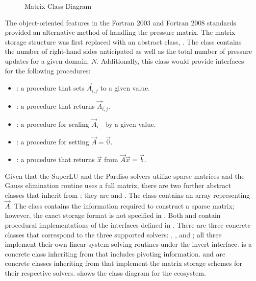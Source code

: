 \begin{figure}[ht!]
\singlespace\centering

\caption{Matrix Class Diagram}
\label{fig:matrixClassDiagram}
\end{figure}

The object-oriented features in the Fortran 2003 and Fortran 2008 standards provided an alternative method of handling the pressure matrix.
The matrix storage structure was first replaced with an abstract class, .
The  class contains the number of right-hand sides anticipated as well as the total number of pressure updates for a given domain, $N$.
Additionally, this class would provide interfaces for the following procedures:

\begin{itemize}
\item{ : a procedure that sets $\vec{A}_{i,j}$ to a given value.}
\item{ : a procedure that returns $\vec{A}_{i,j}$.}
\item{ : a procedure for scaling $\vec{A}_{i, :}$ by a given value.}
\item{ : a procedure for setting $\vec{A} = \vec{0}$.}
\item{ : a procedure that returns $\vec{x}$ from $\vec{A}\vec{x} = \vec{b}$.}
\end{itemize}

Given that the SuperLU and the Pardiso solvers utilize sparse matrices and the Gauss elimination routine uses a full matrix, there are two further abstract classes that inherit from ; they are  and .
The  class contains an array representing $\vec{A}$.
The  class contains the information required to construct a sparse matrix; however, the exact storage format is not specified in .
Both  and  contain procedural implementations of the interfaces defined in .
There are three concrete classes that correspond to the three supported solvers: , , and ; all three implement their own linear system solving routines under the invert interface.
 is a concrete class inheriting from  that includes pivoting information.
 and  are concrete classes inheriting from  that implement the matrix storage schemes for their respective solvers.
 shows the class diagram for the  ecosystem.

